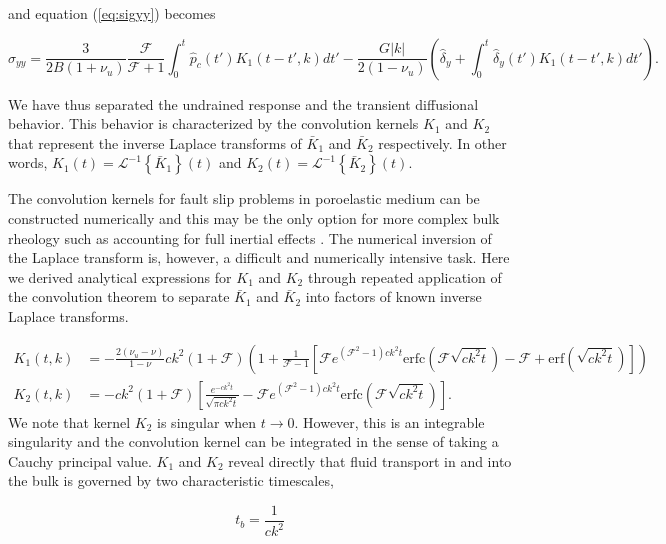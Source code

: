 \documentclass[draft]{agujournal2019}
\begin{document}
 and equation (\ref{eq:sigyy}) becomes
 
\begin{equation}
\hat{\sigma}_{yy} = \frac{3 }{2 B (1 + \nu_u)} \frac{  \mathcal{F} }{\mathcal{F} + 1} \int_0^t \hat{p}_c(t') K_1(t-t',k) dt' - \frac{G |k| }{2(1-\nu_u)} \left( \hat{\delta}_y + \int_0^t \hat{\delta}_y(t') K_1 (t - t',k) dt' \right).
\label{eq:sigyyIL}
\end{equation}

We have thus separated the undrained response and the transient diffusional behavior. This behavior is characterized by the convolution kernels $K_1$ and $K_2$ that represent the inverse Laplace transforms of $\bar{K}_1$ and $\bar{K}_2$ respectively. In other words, $K_1(t) =  \mathcal{L}^{-1} \left\{ \bar{K}_1 \right\} (t)$ and $K_2(t) =  \mathcal{L}^{-1} \left\{ \bar{K}_2 \right\} (t)$.

The convolution kernels for fault slip problems in poroelastic medium can be constructed numerically and this may be the only option for more complex bulk rheology such as accounting for full inertial effects \cite{Heimisson2022spectral}. The numerical inversion of the Laplace transform is, however, a difficult and numerically intensive task. Here we derived analytical expressions for $K_1$ and $K_2$ through repeated application of the convolution theorem to separate $\bar{K}_1$ and $\bar{K}_2$ into factors of known inverse Laplace transforms.

\begin{align}
 K_1(t,k) & =  - \frac{2 (\nu_u - \nu)}{1-\nu} c k^2 (1 + \mathcal{F}) \left( 1 + \frac{1}{\mathcal{F} - 1} \left[ \mathcal{F} e^{ (\mathcal{F}^2-1)c k^2 t } \text{erfc}\left( \mathcal{F}\sqrt{c k^2 t } \right) - \mathcal{F}  + \text{erf} \left( \sqrt{c k^2 t } \right)  \right]   \right) \label{eq:K1}  \\ 
K_2(t,k) & =  - c k^2 (1 + \mathcal{F}) \left[ \frac{e^{-c k^2 t}}{\sqrt{\pi c k^2 t}} - \mathcal{F} e^{ (\mathcal{F}^2-1)c k^2 t } \text{erfc}\left( \mathcal{F}\sqrt{c k^2 t } \right)  \right]  \label{eq:K2}    .
\end{align}	
We note that kernel $K_2$ is singular when $t \rightarrow 0$. However, this is an integrable singularity and the convolution kernel can be integrated in the sense of taking a Cauchy principal value. $K_1$ and $K_2$ reveal directly that fluid transport in and into the bulk is governed by two characteristic timescales,

\begin{equation}
    t_{b} = \frac{1}{c k^2}
    \label{eq:tb}
\end{equation}
\end{document}
